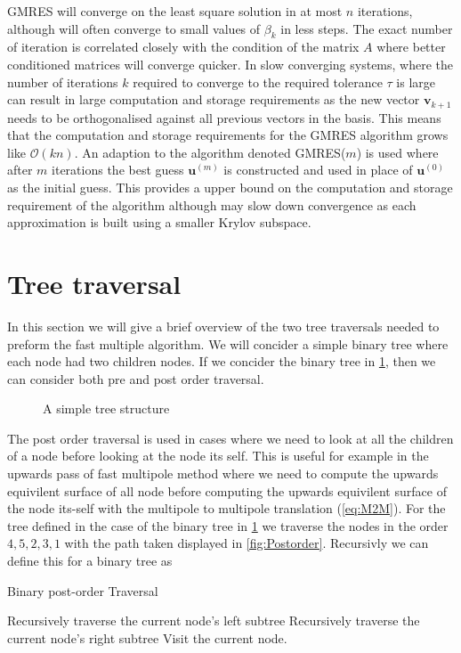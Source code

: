 GMRES will converge on the least square solution in at most $n$ iterations, although will often converge to small values of $\beta_k$ in less steps. The exact number of iteration is correlated closely with the  condition of the matrix $A$ where better conditioned matrices will converge quicker. In slow converging systems, where the number of iterations $k$ required to converge to the required tolerance $\tau$ is large can result in large computation and storage requirements as the new vector $\bm{v}_{k+1}$ needs to be orthogonalised against all previous vectors in the basis. This means that the computation and storage requirements for the GMRES algorithm grows like $\mathcal{O}(kn)$. An adaption to the algorithm denoted GMRES($m$) is used where after $m$ iterations the best guess $\bm{u}^{(m)}$ is constructed and used in place of $\bm{u}^{(0)}$ as the initial guess. This provides a upper bound on the computation and storage requirement of the algorithm although may slow down convergence as each approximation is built using a smaller Krylov subspace.

\section{Tree traversal}\label{appendix:Tree}
In this section we will give a brief overview of the two tree traversals needed to preform the fast multiple algorithm. We will concider a simple binary tree where each node had two children nodes. If we concider the binary tree in \cref{fig:BlankTree}, then we can consider both pre and post order traversal.
\begin{figure}[ht]
    \centering
    \resizebox{.4\linewidth}{!}{}
    \caption{A simple tree structure}
    \label{fig:BlankTree}
\end{figure}
The post order traversal is used in cases where we need to look at all the children of a node before looking at the node its self. This is useful for example in the upwards pass of fast multipole method where we need to compute the upwards equivilent surface of all node before computing the upwards equivilent surface of the node its-self with the multipole to multipole translation (\cref{eq:M2M}). For the tree defined in the case of the binary tree in \cref{fig:BlankTree} we traverse the nodes in the order $4, 5, 2, 3, 1$ with the path taken displayed in \cref{fig:Postorder}. Recursivly we can define this for a binary tree as
\begin{algorithm}
\caption{Binary post-order Traversal}
\begin{algorithmic}[1]
\State Recursively traverse the current node's left subtree
\State Recursively traverse the current node's right subtree
\State Visit the current node.
\end{algorithmic}
\end{algorithm}


